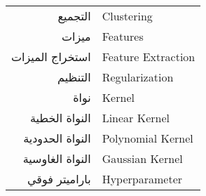 \begin{doublespacing}
\begin{center}
\begin{longtable}{r l}
			
			التجميع		& 			\textenglish{Clustering}				\\
			
			
			ميزات			& 				\textenglish{Features}				\\
			
			
			استخراج الميزات		& 				\textenglish{Feature Extraction}				\\
			
			
			التنظيم		& 			\textenglish{Regularization}	\\
			
			
			نواة		& 			\textenglish{Kernel}	\\
			
			النواة الخطية		& 			\textenglish{Linear Kernel}		\\
			
			النواة الحدودية		& 			\textenglish{Polynomial Kernel}		\\
			
			النواة الغاوسية		& 			\textenglish{Gaussian Kernel}		\\
			
			باراميتر فوقي		& 			\textenglish{Hyperparameter}		\\
			
		\end{longtable}
	\end{center}
\end{doublespacing}

